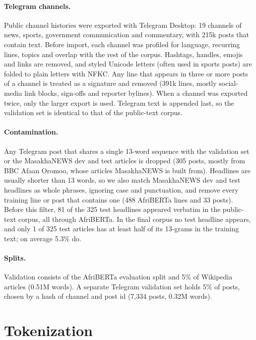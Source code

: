 \documentclass[11pt]{article}
\begin{document}
\paragraph{Telegram channels.} Public channel histories were exported with Telegram Desktop: 19 channels of news, sports, government communication and commentary, with 215k posts that contain text. Before import, each channel was profiled for language, recurring lines, topics and overlap with the rest of the corpus. Hashtags, handles, emojis and links are removed, and styled Unicode letters (often used in sports posts) are folded to plain letters with NFKC. Any line that appears in three or more posts of a channel is treated as a signature and removed (391k lines, mostly social-media link blocks, sign-offs and reporter bylines). When a channel was exported twice, only the larger export is used. Telegram text is appended last, so the validation set is identical to that of the public-text corpus.

\paragraph{Contamination.} Any Telegram post that shares a single 13-word sequence with the validation set or the MasakhaNEWS dev and test articles is dropped (305 posts, mostly from BBC Afaan Oromoo, whose articles MasakhaNEWS is built from). Headlines are usually shorter than 13 words, so we also match MasakhaNEWS dev and test headlines as whole phrases, ignoring case and punctuation, and remove every training line or post that contains one (488 AfriBERTa lines and 33 posts). Before this filter, 81 of the 325 test headlines appeared verbatim in the public-text corpus, all through AfriBERTa. In the final corpus no test headline appears, and only 1 of 325 test articles has at least half of its 13-grams in the training text; on average 5.3\% do.

\paragraph{Splits.} Validation consists of the AfriBERTa evaluation split and 5\% of Wikipedia articles (0.51M words). A separate Telegram validation set holds 5\% of posts, chosen by a hash of channel and post id (7,334 posts, 0.32M words).

\section{Tokenization}
\label{sec:tok}
\end{document}
